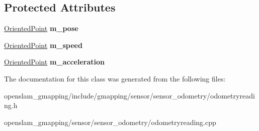 \subsection*{Protected Attributes}
\begin{DoxyCompactItemize}
\item 
\mbox{\label{classGMapping_1_1OdometryReading_a62cfc8b25e477011b3c2803cc0d7ff04}} 
\hyperlink{structGMapping_1_1orientedpoint}{Oriented\+Point} {\bfseries m\+\_\+pose}
\item 
\mbox{\label{classGMapping_1_1OdometryReading_a6ae380b592a0bad9a9c276a5e03af912}} 
\hyperlink{structGMapping_1_1orientedpoint}{Oriented\+Point} {\bfseries m\+\_\+speed}
\item 
\mbox{\label{classGMapping_1_1OdometryReading_aacedefee70bf15dba9598e8e9777d0d7}} 
\hyperlink{structGMapping_1_1orientedpoint}{Oriented\+Point} {\bfseries m\+\_\+acceleration}
\end{DoxyCompactItemize}


The documentation for this class was generated from the following files\+:\begin{DoxyCompactItemize}
\item 
openslam\+\_\+gmapping/include/gmapping/sensor/sensor\+\_\+odometry/odometryreading.\+h\item 
openslam\+\_\+gmapping/sensor/sensor\+\_\+odometry/odometryreading.\+cpp\end{DoxyCompactItemize}
